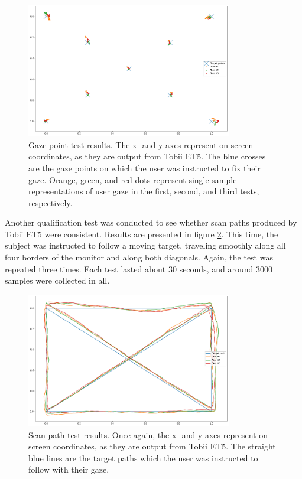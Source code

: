 \begin{figure}[h]
    \centering
    \includegraphics[width=0.8\textwidth]{Images/DataQuality/GazePointTest.png}
    \caption{Gaze point test results. The x- and y-axes represent on-screen coordinates, as they are output from Tobii ET5. The blue crosses are the gaze points on which the user was instructed to fix their gaze. Orange, green, and red dots represent single-sample representations of user gaze in the first, second, and third tests, respectively.}
    \label{fig:res_GazePointTest}
\end{figure}


Another qualification test was conducted to see whether scan paths produced by Tobii ET5 were consistent. Results are presented in figure \ref{fig:res_ScanpathTest}. This time, the subject was instructed to follow a moving target, traveling smoothly along all four borders of the monitor and along both diagonals. Again, the test was repeated three times. Each test lasted about 30 seconds, and around 3000 samples were collected in all.

\begin{figure}[h]
    \centering
    \includegraphics[width=0.8\textwidth]{Images/DataQuality/ScanpathTest.png}
    \caption{Scan path test results. Once again, the x- and y-axes represent on-screen coordinates, as they are output from Tobii ET5. The straight blue lines are the target paths which the user was instructed to follow with their gaze. }
    \label{fig:res_ScanpathTest}
\end{figure}

